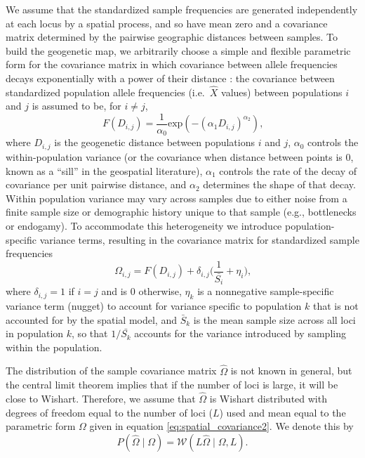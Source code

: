 \documentclass[12pt]{article}
\newcommand{\given}{\mid}
\begin{document}
We assume that the standardized sample frequencies are generated independently at each locus by a spatial process,
and so have mean zero and a covariance matrix determined by the pairwise geographic distances between samples. 
To build the geogenetic map, we arbitrarily choose a simple and flexible parametric form for the covariance matrix 
in which covariance between allele frequencies decays exponentially with a power of their distance
\citep{Diggle1998, Wasser2004, Bradburd2013}:
the covariance between standardized population allele frequencies (i.e.~$\hat X$ values) between populations $i$ and $j$ is assumed to be, for $i \neq j$,
\begin{equation}
\label{eq:spatial_covariance}
F(D_{i,j}) = \frac{1}{\alpha_0} \text{exp} \left(	-\left(\alpha_1 D_{i,j} \right)^{\alpha_2} \right) \text{,}
\end{equation}
where $D_{i,j}$ is the geogenetic distance between populations $i$ and $j$, 
$\alpha_0$ controls the within-population variance 
(or the covariance when distance between points is 0, known as a ``sill'' in the geospatial literature),
$\alpha_1$ controls the rate of the decay of covariance per unit pairwise distance, and $\alpha_2$ determines the shape of that decay.  
Within population variance may vary across samples due to either noise from a finite sample size or demographic history unique to that sample (e.g., bottlenecks or endogamy).  
To accommodate this heterogeneity we introduce population-specific variance terms,
resulting in the covariance matrix for standardized sample frequencies
\begin{equation}
\label{eq:spatial_covariance2}
\Omega_{i,j} =F(D_{i,j}) + \delta_{i,j} \big(\frac{1}{\bar{S_{i}}} + \eta_{i} \big) \text{,}
\end{equation} 
where $\delta_{i,j}=1$ if $i=j$ and is $0$ otherwise,
$\eta_k$ is a nonnegative sample-specific variance term (nugget) to account for variance specific to population $k$ that is not accounted for by the spatial model,
and $\bar{S}_k$ is the mean sample size across all loci in population $k$,
so that $1/\bar{S_k}$ accounts for the variance introduced by sampling within the population.

The distribution of the sample covariance matrix $\hat \Omega$ is not known in general,
but the central limit theorem implies that if the number of loci is large, it will be close to Wishart.
Therefore, we assume that $\hat \Omega$ 
is Wishart distributed with degrees of freedom equal to the number of loci ($L$) used
and mean equal to the parametric form $\Omega$ given in equation \eqref{eq:spatial_covariance2}.
We denote this by
\begin{equation}
\label{eq:wishart_dist}
P(\widehat{\Omega} \given \Omega) = \mathcal{W}\left( L\widehat{\Omega} \mid \Omega, L \right) .
\end{equation}
\end{document}
